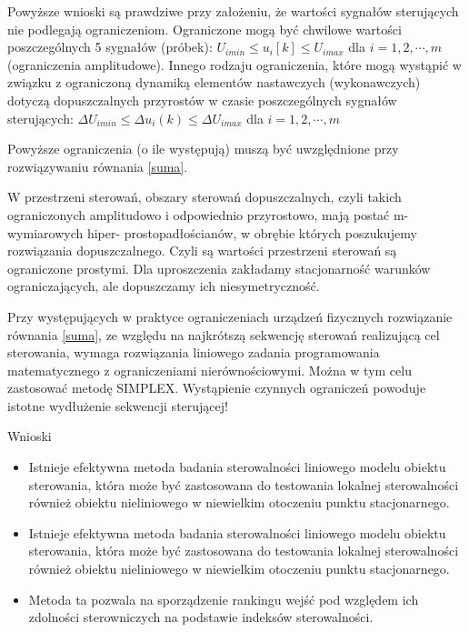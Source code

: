 \documentclass{article}
\begin{document}
			Powyższe wnioski są prawdziwe przy założeniu, że wartości sygnałów sterujących nie
			podlegają ograniczeniom. Ograniczone mogą być chwilowe wartości poszczególnych
			5 sygnałów (próbek): $U_{i min} \leq u_i[k] \leq U_{i max}$ dla
			$i= 1, 2, \cdots , m$ (ograniczenia amplitudowe).
			Innego rodzaju ograniczenia, które mogą wystąpić w związku z ograniczoną dynamiką
			elementów nastawczych (wykonawczych) dotyczą dopuszczalnych przyrostów w czasie
			poszczególnych sygnałów sterujących: $\Delta U_{i min} \leq \Delta u_i(k) \leq \Delta U_{i max} $ dla $i= 1, 2, \cdots , m$

			Powyższe ograniczenia (o ile występują) muszą być uwzględnione przy rozwiązywaniu
			równania \ref{suma}.

			W przestrzeni sterowań, obszary sterowań dopuszczalnych, czyli takich
			ograniczonych
			amplitudowo i odpowiednio przyrostowo, mają postać m-wymiarowych hiper-
			prostopadłościanów, w obrębie których poszukujemy rozwiązania dopuszczalnego.
			Czyli są wartości przestrzeni sterowań są ograniczone prostymi.
			Dla
			uproszczenia zakładamy stacjonarność warunków ograniczających, ale dopuszczamy ich
			niesymetryczność.

			Przy występujących w praktyce ograniczeniach urządzeń fizycznych
			rozwiązanie równania \ref{suma}, ze względu na
			najkrótszą sekwencję sterowań realizującą cel sterowania, wymaga rozwiązania
			liniowego zadania programowania matematycznego z ograniczeniami
			nierównościowymi. Można w tym celu zastosować metodę SIMPLEX.
			Wystąpienie czynnych ograniczeń powoduje istotne wydłużenie sekwencji sterującej!

			Wnioski
			\begin{itemize}
				\item Istnieje efektywna metoda badania sterowalności liniowego
					modelu obiektu
					sterowania, która może być zastosowana do testowania
					lokalnej sterowalności
					również obiektu nieliniowego w niewielkim
					otoczeniu punktu stacjonarnego.
				\item  Istnieje efektywna metoda badania sterowalności
					liniowego modelu obiektu
					sterowania, która może być zastosowana do
					testowania lokalnej sterowalności
					również obiektu nieliniowego w niewielkim
					otoczeniu punktu stacjonarnego.
				\item Metoda ta pozwala na sporządzenie rankingu wejść
					pod względem ich zdolności
					sterowniczych na podstawie indeksów sterowalności.
			\end{itemize}
		
\end{document}
